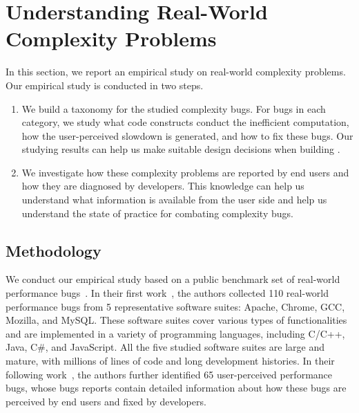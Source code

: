 \section{Understanding Real-World Complexity Problems}
\label{sec:study}

In this section, we report an empirical study on real-world 
complexity problems. Our empirical study is conducted in two steps.

\begin{enumerate}

\item We build a taxonomy for the studied complexity bugs. 
For bugs in each category, 
we study what code constructs conduct the inefficient computation,
how the user-perceived slowdown is generated, 
and how to fix these bugs. 
Our studying results can help us 
make suitable design decisions when building \Tool. 

\item We investigate how these complexity problems are reported by end users
and how they are diagnosed by developers. 
This knowledge can help us understand what information is available from the user side
and help us understand the 
state of practice for combating complexity bugs.



\end{enumerate}

\subsection{Methodology}
\label{sec:meth}

%

We conduct our empirical study based on a public benchmark set of 
real-world performance bugs~\cite{PerfBug,SongOOPSLA2014}. 
In their first work~\cite{PerfBug}, 
the authors collected 110 real-world performance bugs from 5 representative 
software suites: Apache, Chrome, GCC, Mozilla, and MySQL. 
These software suites cover various types of functionalities and are implemented 
in a variety of programming languages, including C/C++, Java, C\#, and JavaScript. 
All the five studied software suites are large and mature, 
with millions of lines of code and long development histories. 
In their following work~\cite{SongOOPSLA2014}, 
the authors further identified 65 user-perceived performance bugs, 
whose bugs reports contain detailed information 
about how these bugs are perceived by end users and fixed by developers.  

